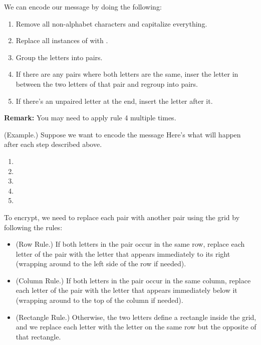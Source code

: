 \documentclass[letterpaper]{article}
\begin{document}
We can encode our message by doing the following: 
\begin{enumerate}
    \item Remove all non-alphabet characters and capitalize everything.
    \item Replace all instances of  with . 
    \item Group the letters into pairs. 
    \item If there are any pairs where both letters are the same, inser the letter  in between the two letters of that pair and regroup into pairs. 
    \item If there's an unpaired letter at the end, insert the letter  after it.
\end{enumerate}
\textbf{Remark:} You may need to apply rule 4 multiple times. 

\begin{mdframed}
    (Example.) Suppose we want to encode the message  Here's what will happen after each step described above. 
    \begin{enumerate}
        \item {}
        \item {}
        \item {}
        \item {}
        \item {}
    \end{enumerate}
\end{mdframed}

To encrypt, we need to replace each pair with another pair using the grid by following the rules: 
\begin{itemize}
    \item (Row Rule.) If both letters in the pair occur in the same row, replace each letter of the pair with the letter that appears immediately to its right (wrapping around to the left side of the row if needed).
    \item (Column Rule.) If both letters in the pair occur in the same column, replace each letter of the pair with the letter that appears immediately below it (wrapping around to the top of the column if needed).
    \item (Rectangle Rule.) Otherwise, the two letters define a rectangle inside the grid, and we replace each letter with the letter on the same row but the opposite of that rectangle.
\end{itemize}
\end{document}
